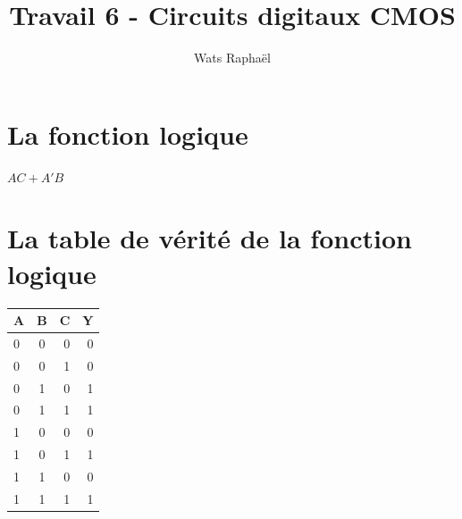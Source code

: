 \documentclass{homeworg}
\title{Travail 6 - Circuits digitaux CMOS}
\author{Wats Raphaël}
\begin{document}
\maketitle

\section{La fonction logique}
\begin{center}
\huge
$AC + A'B$\\
\end{center}

\section{La table de vérité de la fonction logique}
\begin{center}
    \huge
    \begin{tabular}{|l|c|r|r|}
      \hline
      A & B & C & Y\\
      \hline
      0 & 0 & 0 & 0\\
      0 & 0 & 1 & 0\\
      0 & 1 & 0 & 1\\
      0 & 1 & 1 & 1\\
      1 & 0 & 0 & 0\\
      1 & 0 & 1 & 1\\
      1 & 1 & 0 & 0\\
      1 & 1 & 1 & 1\\
      \hline
    \end{tabular}
\end{center}

\newpage
\end{document}
